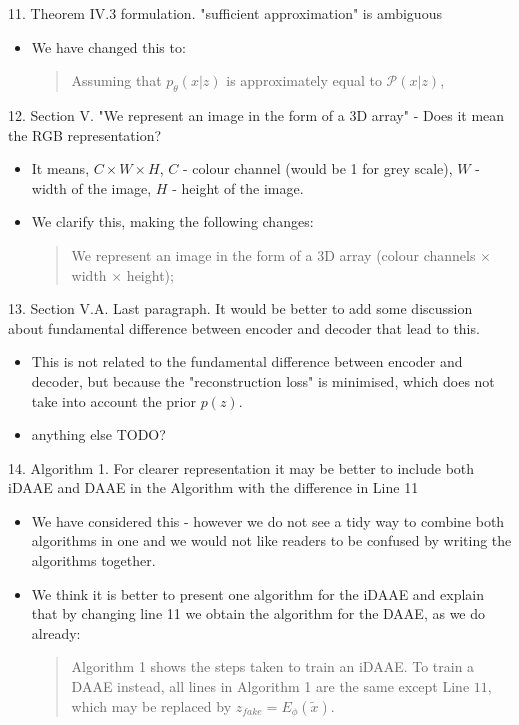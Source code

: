 \documentclass{article}
\begin{document}
{\color{blue}
11. Theorem IV.3 formulation. "sufficient approximation" is ambiguous}
\begin{itemize}
    \item We have changed this to:
    \begin{quote}
        Assuming that $p_\theta(x|z)$ is approximately equal to $\mathcal{P}(x|z)$,
    \end{quote}
\end{itemize}

{\color{blue}
12. Section V. "We represent an image in the form of a 3D array" - Does it mean the RGB representation?}
\begin{itemize}
    \item It means, $C \times W \times H$, $C$ - colour channel (would be 1 for grey scale), $W$ - width of the image, $H$ - height of the image.
    \item We clarify this, making the following changes:
    \begin{quote}
        We represent an image in the form of a $3$D array (colour channels $\times$ width $\times$ height);
    \end{quote}
\end{itemize}

{\color{blue}
13. Section V.A. Last paragraph. It would be better to add some discussion about fundamental difference between encoder and decoder that lead to this.}

\begin{itemize}
    \item This is not related to the fundamental difference between encoder and decoder, but because the "reconstruction loss" is minimised, which does not take into account the prior $p(z)$.
    \item anything else TODO?
\end{itemize}

{\color{blue}
14. Algorithm 1. For clearer representation it may be better to include both iDAAE and DAAE in the Algorithm with the difference in Line 11}

\begin{itemize}
    \item We have considered this - however we do not see a tidy way to combine both algorithms in one and we would not like readers to be confused by writing the algorithms together.
    \item We think it is better to present one algorithm for the iDAAE and explain that by changing line 11 we obtain the algorithm for the DAAE, as we do already:
    \begin{quote}
        Algorithm 1 shows the steps taken to train an iDAAE. To train a DAAE instead, all lines in Algorithm 1 are the same except Line $11$, which may be replaced by $z_{fake} = E_\phi(\tilde{x})$.
    \end{quote}
\end{itemize}
\end{document}
